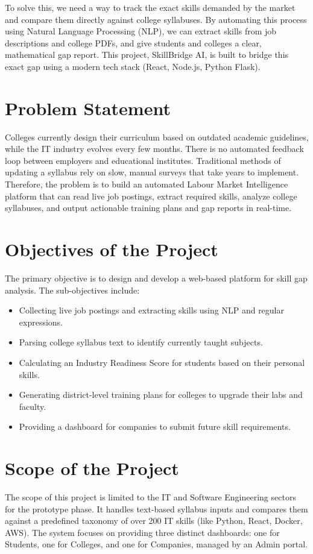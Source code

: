 \documentclass[12pt,a4paper]{report}
\begin{document}
To solve this, we need a way to track the exact skills demanded by the market and compare them directly against college syllabuses. By automating this process using Natural Language Processing (NLP), we can extract skills from job descriptions and college PDFs, and give students and colleges a clear, mathematical gap report. This project, SkillBridge AI, is built to bridge this exact gap using a modern tech stack (React, Node.js, Python Flask).

\section{Problem Statement}
Colleges currently design their curriculum based on outdated academic guidelines, while the IT industry evolves every few months. There is no automated feedback loop between employers and educational institutes. Traditional methods of updating a syllabus rely on slow, manual surveys that take years to implement. Therefore, the problem is to build an automated Labour Market Intelligence platform that can read live job postings, extract required skills, analyze college syllabuses, and output actionable training plans and gap reports in real-time.

\section{Objectives of the Project}
The primary objective is to design and develop a web-based platform for skill gap analysis. The sub-objectives include:
\begin{itemize}
    \item Collecting live job postings and extracting skills using NLP and regular expressions.
    \item Parsing college syllabus text to identify currently taught subjects.
    \item Calculating an Industry Readiness Score for students based on their personal skills.
    \item Generating district-level training plans for colleges to upgrade their labs and faculty.
    \item Providing a dashboard for companies to submit future skill requirements.
\end{itemize}

\section{Scope of the Project}
The scope of this project is limited to the IT and Software Engineering sectors for the prototype phase. It handles text-based syllabus inputs and compares them against a predefined taxonomy of over 200 IT skills (like Python, React, Docker, AWS). The system focuses on providing three distinct dashboards: one for Students, one for Colleges, and one for Companies, managed by an Admin portal.
\end{document}
